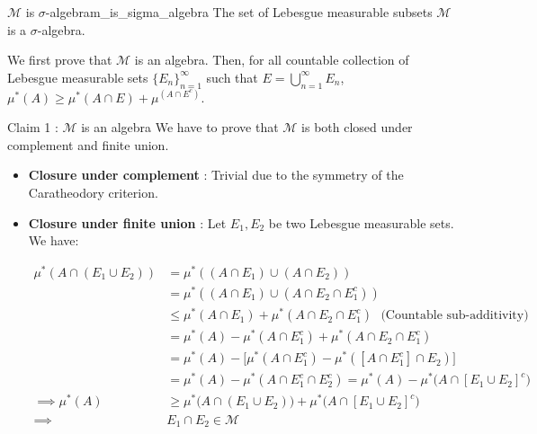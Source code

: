\begin{proposition}{$\mathcal{M}$ is $\sigma$-algebra}{m_is_sigma_algebra}
    The set of Lebesgue measurable subsets $\mathcal{M}$ is a $\sigma$-algebra.
\end{proposition}
\begin{proof*}
    We first prove that $\mathcal{M}$ is an algebra. Then, for all countable collection of Lebesgue measurable sets $\{E_n\}_{n=1}^\infty$ such that $E = \bigcup_{n=1}^\infty E_n$, $\mu^*(A)\ge\mu^*(A\cap E) + \mu^(A\cap E^c)$.
    
    \begin{subproof}{\newline Claim 1 : $\mathcal{M}$ is an algebra}
        We have to prove that $\mathcal{M}$ is both closed under complement and finite union.
        \begin{itemize}
            \item \textbf{Closure under complement} : Trivial due to the symmetry of the Caratheodory criterion.
            \item \textbf{Closure under finite union} : Let $E_1, E_2$ be two Lebesgue measurable sets. We have:
        
            \begin{align*}
                \mu^*(A\cap(E_1\cup E_2)) &= \mu^*((A \cap E_1) \cup (A\cap E_2)) \\
                &=   \mu^*((A \cap E_1) \cup (A\cap E_2 \cap E_1^c)) \\
                &\le \mu^*(A\cap E_1) + \mu^*(A\cap E_2 \cap E_1^c) \ \ \ \text{(Countable sub-additivity)} \\
                &=   \mu^*(A) - \mu^*(A\cap E_1^c) + \mu^*(A\cap E_2 \cap E_1^c) \\
                &=   \mu^*(A) - \Big[ \mu^*(A\cap E_1^c) - \mu^*([A\cap E_1^c] \cap E_2) \Big] \\
                &=   \mu^*(A) - \mu^*(A\cap E_1^c \cap E_2^c) = \mu^*(A) - \mu^*\Big( A \cap [E_1\cup E_2]^c \Big) \\
                \implies \mu^*(A) &\ge \mu^*\Big(A\cap(E_1\cup E_2)\Big) + \mu^*\Big( A \cap [E_1\cup E_2]^c \Big) \\
                \implies & E_1 \cap E_2 \in \mathcal{M}
            \end{align*}
        \end{itemize}
    \end{subproof}


\end{proof*}
